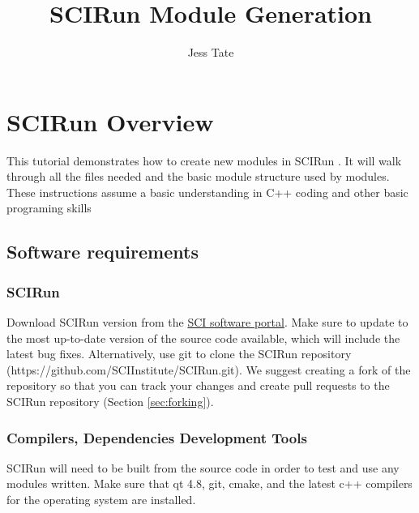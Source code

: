 \documentclass[fleqn,11pt,openany]{book}
\title{SCIRun Module Generation}
\author{Jess Tate}
\begin{document}


\maketitle


\chapter{SCIRun Overview} \label{overview}

\begin{introduction}
This tutorial demonstrates how to create new modules in SCIRun \SCIRunVersion.  It will walk through all the files needed and the basic module structure used by modules.  These instructions assume a basic understanding in C++ coding and other basic programing skills
\end{introduction}

\section{Software requirements}

\subsection{SCIRun  \SCIRunVersion}

Download SCIRun version \SCIRunVersion  from the \href{http://www.scirun.org}{SCI software portal}.
Make sure to update to the most up-to-date version of the source code available, which will include the latest bug fixes.
Alternatively, use git to clone the SCIRun repository (https://github.com/SCIInstitute/SCIRun.git).  
We suggest creating a fork of the repository so that you can track your changes and create pull requests to the SCIRun repository (Section \ref{sec:forking}).  

\subsection{Compilers, Dependencies Development Tools}

SCIRun will need to be built from the source code in order to test and use any modules written.  
Make sure that qt 4.8, git, cmake, and the latest c++ compilers for the operating system are installed.  
\end{document}
